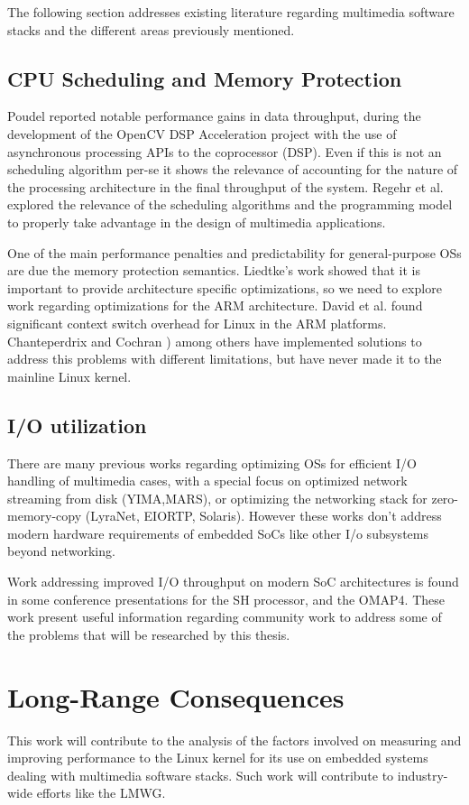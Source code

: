 The following section addresses existing literature regarding multimedia software stacks and the different areas previously mentioned.

\subsection{CPU Scheduling and Memory Protection}
Poudel\cite{Poudel:ys} reported notable performance gains in data throughput, during the development of the OpenCV DSP Acceleration project with the use of asynchronous processing APIs to the coprocessor (\ac{DSP}). Even if this is not an scheduling algorithm per-se it shows the relevance of accounting for the nature of the processing architecture in the final throughput of the system. Regehr et al.\cite{Regehr00operatingsystem} explored the relevance of the scheduling algorithms and the programming model to properly take advantage in the design of multimedia applications.

One of the main performance penalties and predictability for general-purpose \acp{OS} are due the memory protection semantics\cite{Blackham_SH_11}. Liedtke's\citep{Liedtke:1995kx}  work showed that it is important to provide architecture specific optimizations, so we need to explore work regarding optimizations for the \ac{ARM} architecture. David et al.\citep{David:2007:CSO:1281700.1281703}  found significant context switch overhead for Linux in the \ac{ARM} platforms. Chanteperdrix and Cochran \citep{Chanteperdrix:2009fk}) among others have implemented solutions to address this problems with different limitations, but have never made it to the mainline Linux kernel.

\subsection{I/O utilization}
There are many previous works regarding optimizing \acp{OS} for efficient I/O handling of multimedia cases, with a special focus on optimized network streaming from disk (YIMA\cite{Shahabi:2002vn},MARS\cite{Jane98enhancementsto}), or optimizing the networking stack for zero-memory-copy (LyraNet\cite{10.1109/RTCSA.2005.57},  EIORTP\cite{springerlink:10.1007/s11390-006-0989-5}, Solaris\cite{Chu96zero-copytcp}). However these works don't address modern hardware requirements of embedded \ac{SoC}s like other I/o subsystems beyond networking.

Work addressing improved I/O throughput on modern \ac{SoC} architectures is found in some conference presentations for the SH processor\cite{Parker:2009fk}, and the OMAP4\cite{Clark:2010uq}. These work present useful information regarding community work to address some of the problems that will be researched by this thesis.

\section{Long-Range Consequences}
This work will contribute to the analysis of the factors involved on measuring and improving performance to the Linux kernel for its use on embedded systems dealing with multimedia software stacks. Such work will contribute to industry-wide efforts like the \ac{LMWG}. 
